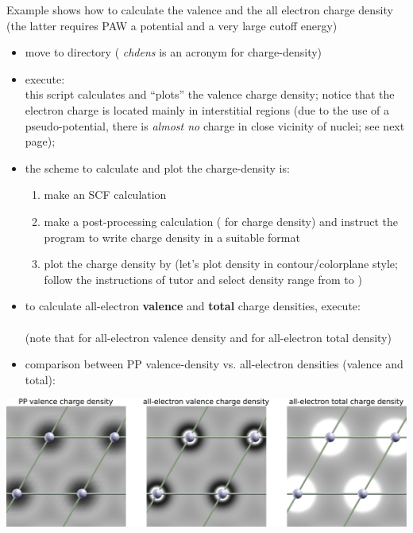 \documentclass[landscape]{foils}
\begin{document}
%
Example  shows how to calculate
the valence and the all electron charge density (the latter requires PAW
a potential and a very large cutoff energy)
\begin{itemize}
\item move to  directory ({\it
    chdens} is an acronym for charge-density)
\item execute: ~\\
  this script calculates and ``plots'' the valence charge density;
  notice that the electron charge is located mainly in interstitial
  regions (due to the use of a pseudo-potential, there is {\it almost
    no} charge in close vicinity of nuclei; see next page);
\item the scheme to calculate and plot the charge-density is:
  \begin{enumerate}
  \item make an SCF  calculation
  \item make a post-processing  calculation
    ( for charge density) and instruct the program to
    write charge density in a suitable format
  \item plot the charge density by  (let's plot density
    in contour/colorplane style; follow the instructions of tutor and
    select density range from  to )
  \end{enumerate}
\end{itemize}


\begin{itemize}
\item to calculate all-electron {\bf valence} and {\bf total} charge densities,
  execute:\\[0.5em]
  \\[0.5em]
  (note that  for all-electron valence density and
   for all-electron total density)

\item comparison between PP valence-density vs.\@{} all-electron densities
  (valence and total):
\end{itemize}
\centerline{\includegraphics[width=1.0\textwidth]{figs/Al-chdens.pdf}}
\end{document}

